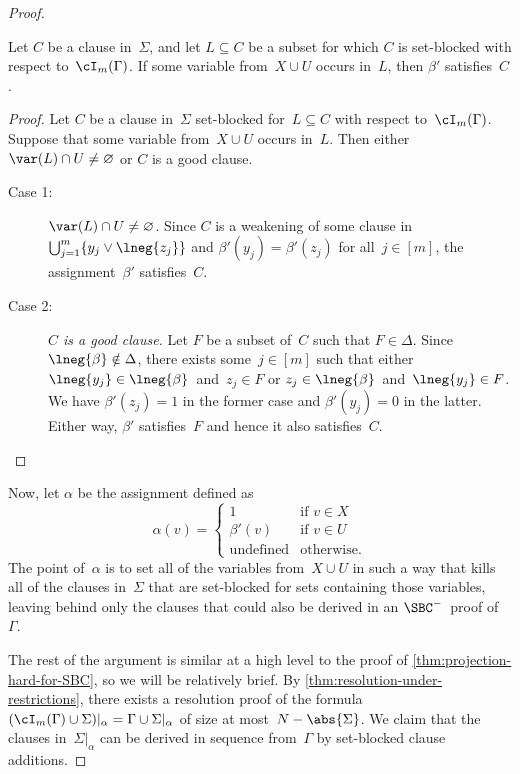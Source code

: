 \documentclass[12pt]{article}
\begin{document}
\begin{proof}
  \begin{claim}\label{thm:beta'-satisfies-XU-SBCs}
    Let $C$ be a clause in~$\Sigma$,
    and let $L \subseteq C$ be a subset
    for which $C$ is set-blocked with respect to~$\cI_m(\Gamma)$.
    If some variable from~$X \cup U$ occurs in~$L$,
    then $\beta'$ satisfies~$C$.
  \end{claim}
  \begin{proof}
    Let $C$ be a clause in~$\Sigma$
    set-blocked for~$L \subseteq C$ with respect to~$\cI_m(\Gamma)$.
    Suppose that some variable from~$X \cup U$ occurs in~$L$.
    Then either $\var(L) \cap U \neq \varnothing$ or $C$ is a good clause.
    \begin{description}
    \item[Case 1:] $\var(L) \cap U \neq \varnothing$.
      Since $C$ is a weakening of some clause
      in~$\bigcup_{j = 1}^m \{y_j \lor \lneg{z_j}\}$
      and $\beta'(y_j) = \beta'(z_j)$ for all~$j \in [m]$,
      the assignment~$\beta'$ satisfies~$C$.
    \item[Case 2:] \textit{$C$ is a good clause.}
      Let $F$ be a subset of~$C$ such that $F \in \Delta$.
      Since $\lneg{\beta} \notin \Delta$,
      there exists some~$j \in [m]$ such that
      either $\lneg{y_j} \in \lneg{\beta}$~and~$z_j \in F$
      or $z_j \in \lneg{\beta}$~and~$\lneg{y_j} \in F$.
      We have $\beta'(z_j) = 1$ in the former case
      and $\beta'(y_j) = 0$ in the latter.
      Either way, $\beta'$ satisfies~$F$ and hence it also satisfies~$C$. \qedhere
    \end{description}
  \end{proof}

  Now, let $\alpha$ be the assignment defined as
  \begin{equation*}
    \alpha(v) =
    \begin{cases}
      1 & \text{if } v \in X \\
      \beta'(v) & \text{if } v \in U \\
      \text{undefined} & \text{otherwise}.
    \end{cases}
  \end{equation*}
  The point of~$\alpha$ is to set all of the variables from~$X \cup U$
  in such a way that kills all of the clauses in~$\Sigma$
  that are set-blocked for sets containing those variables,
  leaving behind only the clauses that could
  also be derived in an $\SBC^-$~proof of~$\Gamma$.

  The rest of the argument is similar at a high level
  to the proof of \cref{thm:projection-hard-for-SBC}, so we will be relatively brief.
  By \cref{thm:resolution-under-restrictions}, there exists a resolution proof
  of the formula~$(\cI_m(\Gamma) \cup \Sigma)|_\alpha = \Gamma \cup \Sigma|_\alpha$
  of size at most~$N - \abs{\Sigma}$.
  We claim that the clauses in~$\Sigma|_\alpha$ can be derived
  in sequence from~$\Gamma$ by set-blocked clause additions.


\end{proof}
\end{document}
